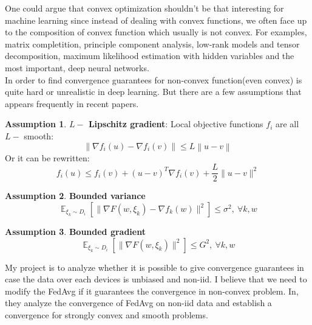 \documentclass{article}
\DeclareMathOperator{\E}{\mathbb{E}}
\theoremstyle{theorem}
\theoremstyle{definition}
\newtheorem{assumption}{Assumption}
\begin{document}
One could argue that convex optimization shouldn't be that interesting for machine learning since instead of dealing with convex functions, we often face up to the composition of convex function which usually is not convex. For examples, matrix completition, principle component analysis, low-rank models and tensor decomposition, maximum likelihood estimation with hidden variables and the most important, deep neural networks.\\
In order to find convergence guarantees for non-convex function(even convex) is quite hard or unrealistic in deep learning. But there are a few assumptions that appears frequently in recent papers.
	\begin{assumption}
		\textbf{$L-$ Lipschitz gradient}: Local objective functions $f_i$ are all $L-$ smooth: $$\left\|\nabla f_i(u)-\nabla f_i(v) \right\| \leq L \left \| u-v \right\|$$
		Or it can be rewritten: $$f_i(u) \le f_i(v)+(u-v)^{T} \nabla f_i(v)+\frac{L}{2} \|u-v\|^2$$
	\end{assumption}
	\begin{assumption}
		\textbf{Bounded variance} $$\E _{\xi_k \sim D_i} \left[\| \nabla F(w, \xi_k)-\nabla f_k(w)\| ^2\right] \le\sigma ^2, \ \forall k,w $$
	\end{assumption}
\begin{assumption}
	\textbf{Bounded gradient} $$\E _{\xi_k \sim D_i} \left[\| \nabla F(w, \xi_k)\| ^2\right] \le G^2, \ \forall k,w $$
\end{assumption}
 My project is to analyze whether it is possible to give convergence guarantees in case the data over each devices is unbiased and non-iid. I believe that we need to modify the FedAvg if it guarantees the convergence in non-convex problem. In\cite{cite5}, they analyze the convergence of FedAvg on non-iid data and establish a convergence for strongly convex and smooth problems.
 
\end{document}

